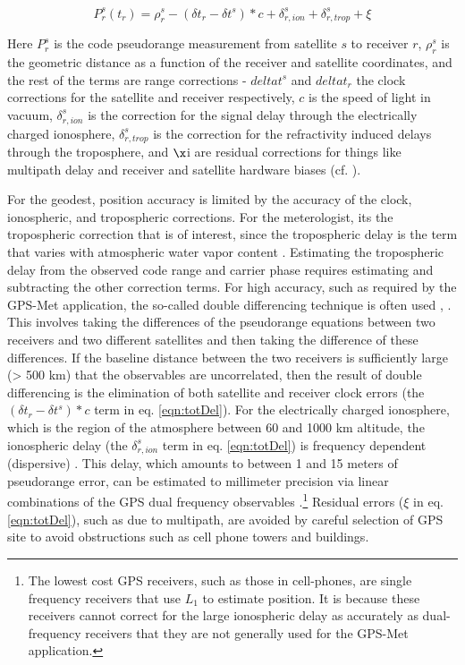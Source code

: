 \documentclass[proposal]{umassthesis}
\begin{document}
{\begin{equation}
P_r^s(t_{r})  = \rho_r^s - (\delta t_r - \delta t^s) * c +  \delta_{r,ion}^s + \delta_{r,trop}^s + \xi
\label{eqn:totDel}
\end{equation}

Here $P_r^s$ is the code pseudorange measurement from satellite $s$ to receiver $r$, $\rho_r^s$ is the geometric distance as a function of the receiver and satellite coordinates, and the rest of the terms are range corrections - $delta t^s$ and $delta t_r$ the clock corrections for the satellite and receiver respectively, $c$ is the speed of light in vacuum, $\delta_{r,ion}^s$ is the correction for the signal delay through the electrically charged ionosphere, $\delta_{r,trop}^s$ is the correction for the refractivity induced delays through the troposphere, and $\x$i are residual corrections for things like multipath delay and receiver and satellite hardware biases (cf. \cite{ming2014}).

For the geodest, position accuracy is limited by the accuracy of the clock, ionospheric, and tropospheric corrections. For the meterologist, its the tropospheric correction that is of interest, since the tropospheric delay is the term that varies with atmospheric water vapor content \cite{bevis1992gps} \cite{rocken1995gps} \cite{duan1996gps}. Estimating the tropospheric delay from the observed code range and carrier phase requires estimating and subtracting the other correction terms. For high accuracy, such as required by the GPS-Met application, the so-called double differencing technique is often used \cite{remondi1984using}, \cite{alber2000obtaining}. This involves taking the differences of the pseudorange equations between two receivers and two different satellites and then taking the difference of these differences. If the baseline distance between the two receivers is sufficiently large (> 500 km) that the observables are uncorrelated, then the result of double differencing is the elimination of both satellite and receiver clock errors (the $(\delta t_r - \delta t^s) * c$ term in eq. \ref{eqn:totDel}). For the electrically charged ionosphere, which is the region of the atmosphere between 60 and 1000 km altitude, the ionospheric delay (the $\delta_{r,ion}^s$ term in eq. \ref{eqn:totDel}) is frequency dependent (dispersive) \cite{spilker1980gps}. This delay, which amounts to between 1 and 15 meters of pseudorange error, can be estimated to millimeter precision via linear combinations of the GPS dual frequency observables \cite{rocken1995gps}.\footnote{The lowest cost GPS receivers, such as those in cell-phones, are single frequency receivers that use $L_1$ to estimate position. It is because these receivers cannot correct for the large ionospheric delay as accurately as dual-frequency receivers that they are not generally used for the GPS-Met application.} Residual errors ($\xi$ in eq. \ref{eqn:totDel}), such as due to multipath, are avoided by careful selection of GPS site to avoid obstructions such as cell phone towers and buildings.

}
\end{document}
